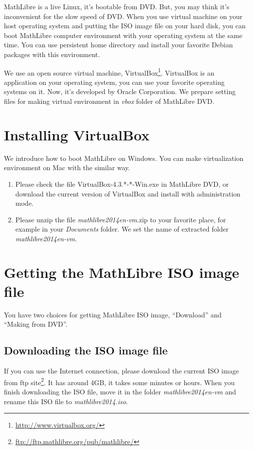 \documentclass[a4,twocolumn]{article}
\newcommand{\vboxwin}{VirtualBox-4.3.*-*-Win.exe}
\newcommand{\vm}{{\em mathlibre2014en-vm}}
\begin{document}
\chead{}
\lfoot{}
\cfoot{}
\rfoot{}
MathLibre is a live Linux, it's bootable from DVD.
But, you may think it's inconvenient for the slow speed of DVD.
When you use virtual machine on your host operating system and
putting the ISO image file on your hard disk,
you can boot MathLibre computer environment with your operating system
at the same time.
You can use persistent home directory and install your favorite Debian
packages with this environment.

We use an open source virtual machine,
VirtualBox\footnote{\url{http://www.virtualbox.org/}}.
VirtualBox is an application on your operating system,
you can use your favorite operating systems on it.
Now, it's developed by Oracle Corporation.
We prepare setting files for making virtual environment 
in {\em vbox} folder of MathLibre DVD.

\section{Installing VirtualBox}
We introduce how to boot MathLibre on Windows. You can make
virtualization environment on Mac with the similar way.
\begin{enumerate}
 \item Please check the file \vboxwin{} in MathLibre DVD, or download the
       current version of VirtualBox and install with administration mode.
 \item Please unzip the file \vm.zip{} to your favorite place, for example
       in your {\em Documents} folder. We set the name of extracted folder \vm{}.
\end{enumerate}

\section{Getting the MathLibre ISO image file}
You have two choices for getting MathLibre ISO image,
``Download'' and ``Making from DVD''.

\subsection{Downloading the ISO image file}
If you can use the Internet connection,
please download the current ISO image from ftp site\footnote{\url{ftp://ftp.mathlibre.org/pub/mathlibre/}}.
It has around 4GB, it takes some minutes or hours.
When you finish downloading the ISO file,
move it in the folder \vm{} and rename this ISO file to
{\em mathlibre2014.iso}. 
\end{document}
